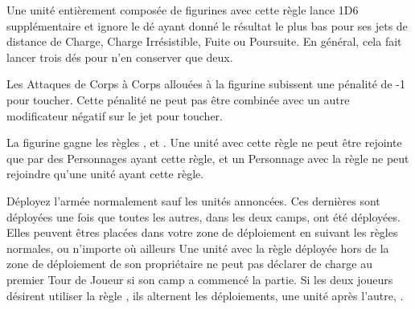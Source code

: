 
Une unité entièrement composée de figurines avec cette règle lance 1D6 supplémentaire et ignore le dé ayant donné le résultat le plus bas pour ses jets de distance de Charge, Charge Irrésistible, Fuite ou Poursuite. En général, cela fait lancer trois dés pour n'en conserver que deux.


Les Attaques de Corps à Corps allouées à la figurine subissent une pénalité de -1 pour toucher. Cette pénalité ne peut pas être combinée avec un autre modificateur négatif sur le jet pour toucher.


La figurine gagne les règles \magicalattacks{}, \immunetopsychology{} et . Une unité avec cette règle ne peut être rejointe que par des Personnages ayant cette règle, et un Personnage avec la règle \otherworldly{} ne peut rejoindre qu'une unité ayant cette règle.


 Déployez l'armée normalement sauf les unités annoncées. Ces dernières sont déployées une fois que toutes les autres, dans les deux camps, ont été déployées. Elles peuvent êtres placées dans votre zone de déploiement en suivant les règles normales, ou n'importe où ailleurs  Une unité avec la règle \scout{} déployée hors de la zone de déploiement de son propriétaire ne peut pas déclarer de charge au premier Tour de Joueur si son camp a commencé la partie. Si les deux joueurs désirent utiliser la règle \scout{}, ils alternent les déploiements, une unité après l'autre, .


